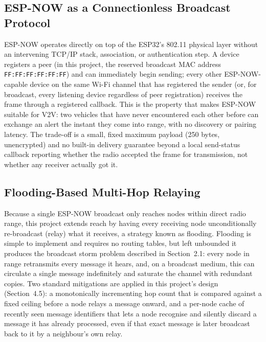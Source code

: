 \documentclass[12pt,a4paper]{report}
\begin{document}
\subsection{ESP-NOW as a Connectionless Broadcast Protocol}
ESP-NOW operates directly on top of the ESP32's 802.11 physical layer without an intervening TCP/IP stack, association, or authentication step. A device registers a peer (in this project, the reserved broadcast MAC address \texttt{FF:FF:FF:FF:FF:FF}) and can immediately begin sending; every other ESP-NOW-capable device on the same Wi-Fi channel that has registered the sender (or, for broadcast, every listening device regardless of peer registration) receives the frame through a registered callback. This is the property that makes ESP-NOW suitable for V2V: two vehicles that have never encountered each other before can exchange an alert the instant they come into range, with no discovery or pairing latency. The trade-off is a small, fixed maximum payload (250 bytes, unencrypted) and no built-in delivery guarantee beyond a local send-status callback reporting whether the radio accepted the frame for transmission, not whether any receiver actually got it.

\subsection{Flooding-Based Multi-Hop Relaying}
Because a single ESP-NOW broadcast only reaches nodes within direct radio range, this project extends reach by having every receiving node unconditionally re-broadcast (relay) what it receives, a strategy known as flooding. Flooding is simple to implement and requires no routing tables, but left unbounded it produces the broadcast storm problem described in Section~2.1: every node in range retransmits every message it hears, and, on a broadcast medium, this can circulate a single message indefinitely and saturate the channel with redundant copies. Two standard mitigations are applied in this project's design (Section~4.5): a monotonically incrementing hop count that is compared against a fixed ceiling before a node relays a message onward, and a per-node cache of recently seen message identifiers that lets a node recognise and silently discard a message it has already processed, even if that exact message is later broadcast back to it by a neighbour's own relay.
\end{document}
